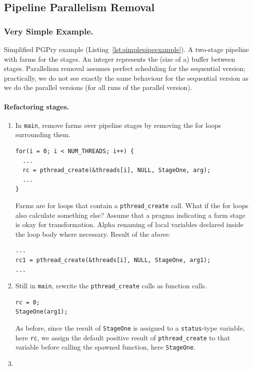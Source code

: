 \subsection{Pipeline Parallelism Removal}



\subsubsection{Very Simple Example.}

Simplified PGPry example (Listing~\ref{lst:simplepipeexample}). A two-stage pipeline with farms for the stages. An integer represents the (size of a) buffer between stages. Parallelism removal assumes perfect scheduling for the sequential version; practically, we do not see exactly the same behaviour for the sequential version as we do the parallel versions (for all runs of the parallel version).

\paragraph{Refactoring stages.}
\iffalse


\begin{enumerate}
\item In \lstinline|main|, remove farms over pipeline stages by removing the for loops surrounding them.
\begin{lstlisting}[frame=single]
for(i = 0; i < NUM_THREADS; i++) {
  ...
  rc = pthread_create(&threads[i], NULL, StageOne, arg);
  ...
}
\end{lstlisting}
Farms are for loops that contain a \lstinline|pthread_create| call. What if the for loops also calculate something else? Assume that a pragma indicating a farm stage is okay for transformation. Alpha renaming of local variables declared inside the loop body where necessary. Result of the above:
\begin{lstlisting}[frame=single]
...
rc1 = pthread_create(&threads[i], NULL, StageOne, arg1);
...
\end{lstlisting}
\item Still in \lstinline|main|, rewrite the \lstinline|pthread_create| calls as function calls.
\begin{lstlisting}[frame=single]
rc = 0;
StageOne(arg1);
\end{lstlisting}
As before, since the result of \lstinline|StageOne| is assigned to a \lstinline|status|-type variable, here \lstinline|rc|, we assign the default positive result of \lstinline|pthread_create| to that variable before calling the spawned function, here \lstinline|StageOne|.
\item 
\end{enumerate}

